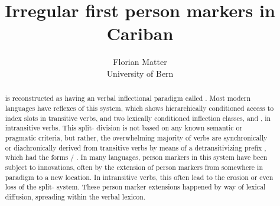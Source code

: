 
\newcommand{\detrz}{\rc{əte}\slash{}\obj{e-}}
\usepackage{phonrule}
\usepackage{amsthm,etoolbox,xcolor}

\title{Irregular first person markers in Cariban\\}

\author{Florian Matter \\ University of Bern}


\pagestyle{empty}
\maketitle	

\begin{abstract}
\PC is reconstructed as having an verbal inflectional paradigm called \dbqu{\setone} \parencite{gildea1998}.
Most modern languages have reflexes of this system, which shows hierarchically conditioned access to index slots in transitive verbs, and two lexically conditioned inflection classes,  and , in intransitive verbs.
This split- division is not based on any known semantic or pragmatic criteria, but rather, the overwhelming majority of  verbs are synchronically or diachronically derived from transitive verbs by means of a detransitivizing prefix \parencite{meira2000split}, which had the forms \detrz{} \parencite{meira2010origin}.
In many languages, person markers in this system have been subject to innovations, often by the extension of person markers from somewhere in paradigm to a new location.
In intransitive verbs, this often lead to the erosion or even loss of the split- system.
These person marker extensions happened by way of lexical diffusion, spreading within the verbal lexicon.


\end{abstract}
